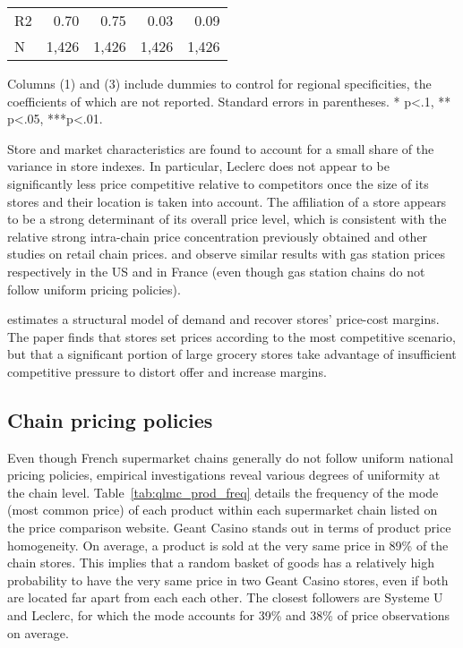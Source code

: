 \documentclass[english]{article}
\begin{document}
\begin{table}[H]
\begin{threeparttable}
\begin{tabular}{lrrrr}
\midrule
R2                                                      & 0.70      & 0.75     & 0.03      & 0.09       \\
N                                                       & 1,426     & 1,426    & 1,426     & 1,426      \\
\bottomrule
\bottomrule
\end{tabular}
\begin{tablenotes}
      \small
      \item Columns (1) and (3) include dummies to control for regional specificities, the coefficients of which are not reported. Standard errors in parentheses. * p<.1, ** p<.05, ***p<.01.
\end{tablenotes}
\end{threeparttable}
\end{table}

Store and market characteristics are found to account for a small share of the variance in store indexes. In particular, Leclerc does not appear to be significantly less price competitive relative to competitors once the size of its stores and their location is taken into account. The affiliation of a store appears to be a strong determinant of its overall price level, which is consistent with the relative strong intra-chain price concentration previously obtained and other studies on retail chain prices. \cite{HOS08} and \cite{CHA16} observe similar results with gas station prices respectively in the US and in France (even though gas station chains do not follow uniform pricing policies).

\cite{TUR16} estimates a structural model of demand and recover stores' price-cost margins. The paper finds that stores set prices according to the most competitive scenario, but that a significant portion of large grocery stores take advantage of insufficient competitive pressure to distort offer and increase margins.

\subsection{Chain pricing policies}

Even though French supermarket chains generally do not follow uniform national pricing policies, empirical investigations reveal various degrees of uniformity at the chain level. Table~\ref{tab:qlmc_prod_freq} details the frequency of the mode (most common price) of each product within each supermarket chain listed on the price comparison website. Geant Casino stands out in terms of product price homogeneity. On average, a product is sold at the very same price in 89\% of the chain stores. This implies that a random basket of goods has a relatively high probability to have the very same price in two Geant Casino stores, even if both are located far apart from each each other. The closest followers are Systeme U and Leclerc, for which the mode accounts for 39\% and 38\% of price observations on average.
\end{document}
